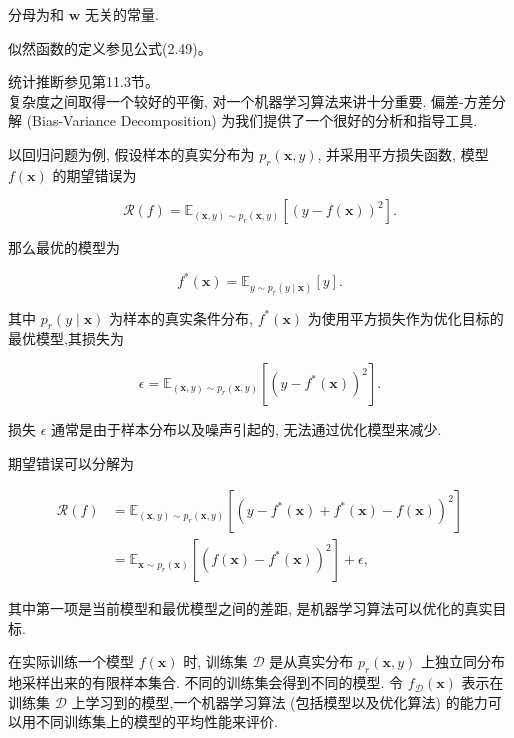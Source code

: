 \documentclass[10pt]{article}
\begin{document}
分母为和 $\boldsymbol{w}$ 无关的常量.

似然函数的定义参见公式(2.49)。

统计推断参见第11.3节。\\
复杂度之间取得一个较好的平衡, 对一个机器学习算法来讲十分重要. 偏差-方差分解 (Bias-Variance Decomposition) 为我们提供了一个很好的分析和指导工具.

以回归问题为例, 假设样本的真实分布为 $p_{r}(\boldsymbol{x}, y)$, 并采用平方损失函数, 模型 $f(\boldsymbol{x})$ 的期望错误为


\begin{equation*}
\mathcal{R}(f)=\mathbb{E}_{(\boldsymbol{x}, y) \sim p_{r}(\boldsymbol{x}, y)}\left[(y-f(\boldsymbol{x}))^{2}\right] . \tag{2.60}
\end{equation*}


那么最优的模型为


\begin{equation*}
f^{*}(\boldsymbol{x})=\mathbb{E}_{y \sim p_{r}(y \mid \boldsymbol{x})}[y] . \tag{2.61}
\end{equation*}


其中 $p_{r}(y \mid \boldsymbol{x})$ 为样本的真实条件分布, $f^{*}(\boldsymbol{x})$ 为使用平方损失作为优化目标的最优模型,其损失为


\begin{equation*}
\epsilon=\mathbb{E}_{(\boldsymbol{x}, y) \sim p_{r}(\boldsymbol{x}, y)}\left[\left(y-f^{*}(\boldsymbol{x})\right)^{2}\right] . \tag{2.62}
\end{equation*}


损失 $\epsilon$ 通常是由于样本分布以及噪声引起的, 无法通过优化模型来减少.

期望错误可以分解为


\begin{align*}
\mathcal{R}(f) & =\mathbb{E}_{(\boldsymbol{x}, y) \sim p_{r}(\boldsymbol{x}, y)}\left[\left(y-f^{*}(\boldsymbol{x})+f^{*}(\boldsymbol{x})-f(\boldsymbol{x})\right)^{2}\right]  \tag{2.63}\\
& =\mathbb{E}_{\boldsymbol{x} \sim p_{r}(\boldsymbol{x})}\left[\left(f(\boldsymbol{x})-f^{*}(\boldsymbol{x})\right)^{2}\right]+\epsilon, \tag{2.64}
\end{align*}


其中第一项是当前模型和最优模型之间的差距, 是机器学习算法可以优化的真实目标.

在实际训练一个模型 $f(\boldsymbol{x})$ 时, 训练集 $\mathcal{D}$ 是从真实分布 $p_{r}(\boldsymbol{x}, y)$ 上独立同分布地采样出来的有限样本集合. 不同的训练集会得到不同的模型. 令 $f_{\mathcal{D}}(\boldsymbol{x})$ 表示在训练集 $\mathcal{D}$ 上学习到的模型,一个机器学习算法 (包括模型以及优化算法) 的能力可以用不同训练集上的模型的平均性能来评价.
\end{document}

